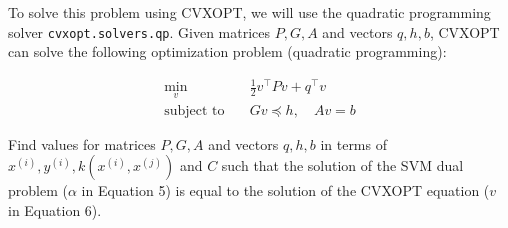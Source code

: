 \documentclass[lang=cn,11pt]{elegantbook}
\begin{document}
To solve this problem using CVXOPT, we will use the quadratic programming solver \texttt{cvxopt.solvers.qp}. 
Given matrices $P, G, A$ and vectors $q, h, b$, CVXOPT can solve the following optimization problem (quadratic programming):

\begin{align}
\min_{v} \quad & \frac{1}{2} v^\top P v + q^\top v \\
\text{subject to} \quad & G v \preceq h, \quad A v = b
\end{align}

Find values for matrices $P, G, A$ and vectors $q, h, b$ in terms of $x^{(i)}, y^{(i)}, k(x^{(i)}, x^{(j)})$ and $C$ such that
the solution of the SVM dual problem ($\alpha$ in Equation 5) is equal to the solution of the CVXOPT equation 
($v$ in Equation 6).
\end{document}
